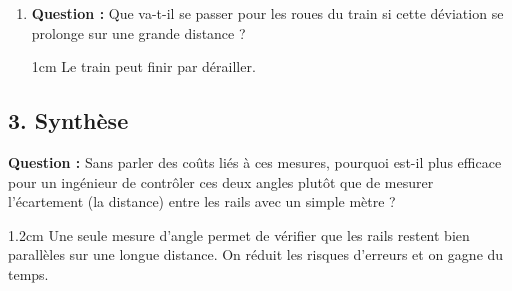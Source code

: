 \documentclass[a4paper]{book}
\begin{document}
{\begin{exercice}
\begin{enumerate}
            \item \textbf{Question :} Que va-t-il se passer pour les roues du train si cette déviation se prolonge sur une grande distance ?

            \begin{ZoneReponse}{1cm}
                Le train peut finir par dérailler.
            \end{ZoneReponse}
        \end{enumerate}
        
        \subsection*{3. Synthèse}
        \textbf{Question :} Sans parler des coûts liés à ces mesures, pourquoi est-il plus efficace pour un ingénieur de contrôler ces deux angles plutôt que de mesurer l'écartement (la distance) entre les rails avec un simple mètre ?

        \begin{ZoneReponse}{1.2cm}
            Une seule mesure d'angle permet de vérifier que les rails restent bien parallèles sur une longue distance. On réduit les risques d'erreurs et on gagne du temps.
        \end{ZoneReponse}
    \end{exercice}

}
\end{document}
